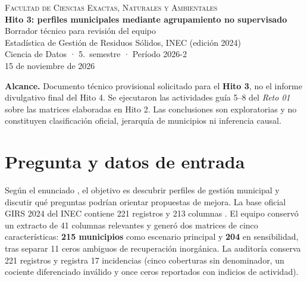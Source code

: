 \documentclass[10pt,a4paper]{article}
\begin{document}
\begin{center}
  {\small\scshape Facultad de Ciencias Exactas, Naturales y Ambientales}\\[1.1cm]
  {\Large\bfseries Hito 3: perfiles municipales mediante agrupamiento no supervisado}\\[.35cm]
  {\large\color{institucional} Borrador técnico para revisión del equipo}\\[.5cm]
  {\normalsize Estadística de Gestión de Residuos Sólidos, INEC (edición 2024)}\\[.7cm]
  {\small Ciencia de Datos · 5.\ semestre · Período 2026-2}\\[.2cm]
  {\small 15 de noviembre de 2026}
\end{center}
\vspace{.4cm}
\noindent\colorbox{blue!5}{\parbox{\dimexpr\linewidth-2\fboxsep\relax}{\footnotesize\textbf{Alcance.} Documento técnico provisional solicitado para el \textbf{Hito 3}, no el informe divulgativo final del Hito 4. Se ejecutaron las actividades guía 5--8 del \textit{Reto 01} sobre las matrices elaboradas en Hito 2. Las conclusiones son exploratorias y no constituyen clasificación oficial, jerarquía de municipios ni inferencia causal.}}
\section{Pregunta y datos de entrada}
Según el enunciado \parencite{merino2026reto}, el objetivo es descubrir perfiles de gestión municipal y discutir qué preguntas podrían orientar propuestas de mejora. La base oficial GIRS 2024 del INEC contiene 221 registros y 213 columnas \parencite{inec2024dataset}. El equipo conservó un extracto de 41 columnas relevantes y generó dos matrices de cinco características: \textbf{215 municipios} como escenario principal y \textbf{204} en sensibilidad, tras separar 11 ceros ambiguos de recuperación inorgánica. La auditoría conserva 221 registros y registra 17 incidencias (cinco coberturas sin denominador, un cociente diferenciado inválido y once ceros reportados con indicios de actividad).
\end{document}
